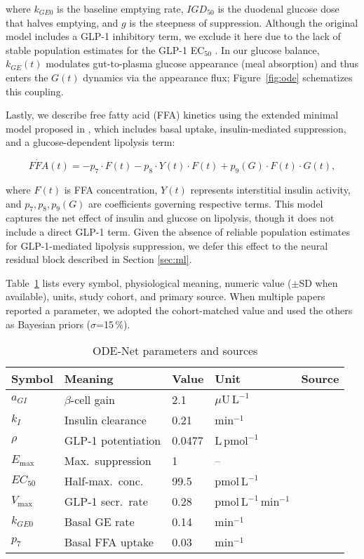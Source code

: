 \documentclass[9pt,shortpaper,twoside,web]{ieeecolor}
\begin{document}
where \( k_{GE0} \) is the baseline emptying rate, \( IGD_{50} \) is the duodenal glucose dose that halves emptying, and \( g \) is the steepness of suppression. Although the original model includes a GLP-1 inhibitory term, we exclude it here due to the lack of stable population estimates for the GLP-1 EC\(_{50}\) \cite{Alskar2016}. In our glucose balance, $k_{GE}(t)$ modulates gut-to-plasma glucose appearance (meal absorption) and thus enters the $G(t)$ dynamics via the appearance flux; Figure~\ref{fig:ode} schematizes this coupling.

Lastly, we describe free fatty acid (FFA) kinetics using the extended minimal model proposed in \cite{Roy2006}, which includes basal uptake, insulin-mediated suppression, and a glucose-dependent lipolysis term:

\begin{equation}
\dot{FFA}(t) = -p_7 \cdot F(t) - p_8 \cdot Y(t) \cdot F(t) + p_9(G) \cdot F(t) \cdot G(t),
\label{eq:FFA}
\end{equation}

where \( F(t) \) is FFA concentration, \( Y(t) \) represents interstitial insulin activity, and \( p_7, p_8, p_9(G) \) are coefficients governing respective terms. This model captures the net effect of insulin and glucose on lipolysis, though it does not include a direct GLP-1 term. Given the absence of reliable population estimates for GLP-1-mediated lipolysis suppression, we defer this effect to the neural residual block described in Section \ref{sec:ml}.

Table~\ref{tab:params} lists every symbol, physiological meaning,
numeric value (\(\pm\)SD when available), units, study cohort, and
primary source.  When multiple papers reported a parameter, we adopted
the cohort-matched value and used the others as Bayesian priors
(\(\sigma\)=15\,\%).

\begin{table}[!t]
\centering
\caption{ODE‐Net parameters and sources}
\label{tab:params}
\begin{tabular}{lllll}
\toprule
Symbol & Meaning & Value & Unit & Source\\
\midrule
\(a_{GI}\) & $\beta$-cell gain & 2.1 & \(\mu\mathrm{U\,L^{-1}}\) &
\cite{DallaMan2007}\\
\(k_I\) & Insulin clearance & 0.21 & \(\mathrm{min^{-1}}\) &
\cite{DallaMan2007}\\
\(\rho\) & GLP-1 potentiation & 0.0477 & \(\mathrm{L\,pmol^{-1}}\) &
\cite{DallaMan2016}\\
\(E_{\max}\) & Max.\ suppression & 1 & – & \cite{Bosch2022}\\
\(EC_{50}\) & Half-max.\ conc. & 99.5 & \(\mathrm{pmol\,L^{-1}}\) &
\cite{Bosch2022}\\
\(V_{\max}\) & GLP-1 secr.\ rate & 0.28 & \(\mathrm{pmol\,L^{-1}\,min^{-1}}\) &
\cite{Roge2017}\\
\(k_{GE0}\) & Basal GE rate & 0.14 & \(\mathrm{min^{-1}}\) &
\cite{Alskar2016}\\
\(p_7\) & Basal FFA uptake & 0.03 & \(\mathrm{min^{-1}}\) &
\cite{Roy2006}\\
\bottomrule
\end{tabular}
\end{table}
\end{document}
